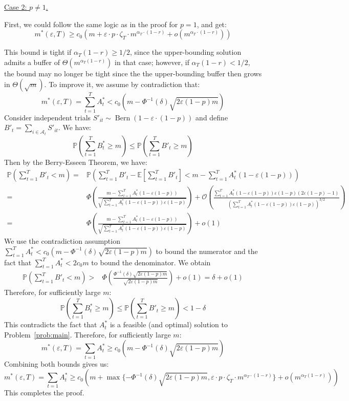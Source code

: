 \documentclass[nonblindrev]{informs3noheader}
\DeclareMathOperator{\Bern}{Bern}
\def\E{\mathbb{E}}
\def\P{\mathbb{P}}
\def\calO{\mathcal{O}}
\begin{document}
\underline{Case 2: $p\neq 1$.}

First, we could follow the same logic as in the proof for $p=1$, and get:
\[m^*(\varepsilon,T) \geq c_0\left( m+\varepsilon\cdot p\cdot \zeta_T \cdot m^{\alpha_T\cdot(1-r)} +  o\left(m^{\alpha_T\cdot(1-r)}\right)\right)\]

This bound is tight if $\alpha_T(1-r)\geq1/2$, since the upper-bounding solution admits a buffer of $\Theta(m^{\alpha_T(1-r)})$ in that case; however, if $\alpha_T(1-r)<1/2$, the bound may no longer be tight since the the upper-bounding buffer then grows in $\Theta(\sqrt{m})$. To improve it, we assume by contradiction that:
\[m^*(\varepsilon,T)=\sum_{t=1}^T A^*_t <c_0\left(m -\Phi^{-1}(\delta)\sqrt{2\varepsilon(1-p)m}\right)\]
Consider independent trials $S'_{it} \sim \Bern\left(1-\varepsilon\cdot(1-p)\right)$ and define $B'_t = \sum_{i \in \mathcal{A}_t} S'_{it}$. We have:
\[\P\left(\sum_{t=1}^T B^*_t \geq m\right)\leq \P\left(\sum_{t=1}^T B'_t \geq m\right)\]
Then by the Berry-Esseen Theorem, we have:
\begin{align*}
    \P\left(\sum_{t=1}^T B'_t<m \right)
    =&\P\left(\sum_{t=1}^T B'_t -\E\left[\sum_{t=1}^T B'_t \right] <m-\sum_{t=1}^T A^*_t (1-\varepsilon(1-p)) \right)
    \\=&\Phi\left(\frac{m-\sum_{t=1}^T A^*_t (1-\varepsilon(1-p))}{\sqrt{\sum_{t=1}^T A^*_t (1-\varepsilon(1-p))\varepsilon(1-p)}}\right) + \calO\left(\frac{\sum_{t=1}^TA^*_t(1-\varepsilon(1-p))\varepsilon(1-p)(2\varepsilon(1-p)-1)}{\left(\sum_{t=1}^T A^*_t (1-\varepsilon(1-p))\varepsilon(1-p)\right)^{3/2}}\right)
    \\=&\Phi\left(\frac{m-\sum_{t=1}^T A^*_t (1-\varepsilon(1-p))}{\sqrt{\sum_{t=1}^T A^*_t (1-\varepsilon(1-p))\varepsilon(1-p)}}\right) + o(1)
\end{align*}
We use the contradiction assumption $\sum_{t=1}^T A^*_t < c_0\left(m -\Phi^{-1}(\delta)\sqrt{2\varepsilon(1-p)m}\right)$ to bound the numerator and the fact that $\sum_{t=1}^T A^*_t<2c_0m$ to bound the denominator. We obtain
\begin{align*}
    \P\left(\sum_{t=1}^T B'_t<m \right)> &\Phi\left(\frac{\Phi^{-1}(\delta)\sqrt{2\varepsilon(1-p)m}}{\sqrt{2\varepsilon(1-p)m}}\right) + o(1)   =\delta +o(1)
\end{align*}
Therefore, for sufficiently large $m$:
\[\P\left(\sum_{t=1}^T B^*_t \geq m\right)\leq \P\left(\sum_{t=1}^T B'_t \geq m\right)<1-\delta\]
This contradicts the fact that $A^*_t$ is a feasible (and optimal) solution to Problem~\eqref{prob:main}. Therefore, for sufficiently large $m$:
\[m^*(\varepsilon, T)=\sum_{t=1} A_t^* \geq c_0\left(m -\Phi^{-1}(\delta)\sqrt{2\varepsilon(1-p)m}\right)\]
Combining both bounds gives us:
\[m^*(\varepsilon, T)=\sum_{t=1} A_t^* \geq c_0\left(m +\max\{-\Phi^{-1}(\delta)\sqrt{2\varepsilon(1-p)m},\varepsilon\cdot p\cdot\zeta_T\cdot m^{\alpha_T\cdot(1-r)}\}+o\left(m^{\alpha_T(1-r)}\right)\right)\]
This completes the proof.
\hfill\Halmos
\end{document}
